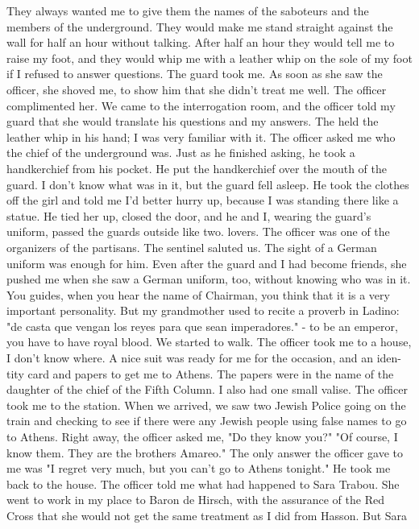 They always wanted me to give them the names of the saboteurs and the 
members of the underground. They would make me stand straight against 
the wall for half an hour without talking. After half an hour they 
would tell me to raise my foot, and they would whip me with a leather 
whip on the sole of my foot if I refused to answer questions. 
The guard took me. As soon as she saw the officer, she shoved me, 
to show him that she didn't treat me well. The officer complimented her. 
We came to the interrogation room, and the officer told my guard that 
she would translate his questions and my answers. The held the 
leather whip in his hand; I was very familiar with it. The officer asked 
me who the chief of the underground was. Just as he finished asking, 
he took a handkerchief from his pocket. He put the handkerchief 
over the mouth of the guard. I don't know what was in it, but the 
guard fell asleep. He took the clothes off the girl and told me I'd 
better hurry up, because I was standing there like a statue. He tied
her up, closed the door, and he and I, wearing the guard's uniform, 
passed the guards outside like two. lovers. The officer was one of the 
organizers of the partisans. The sentinel saluted us. The sight of a 
German uniform was enough for him. Even after the guard and I had 
become friends, she pushed me when she saw a German uniform, too, 
without knowing who was in it. 
You guides, when you hear the name of Chairman, you think that it 
is a very important personality. But my grandmother used to recite a 
proverb in Ladino: "de casta que vengan los reyes para que sean imperadores." 
- to be an emperor, you have to have royal blood. 
We started to walk. The officer took me to a house, I don't know 
where. A nice suit was ready for me for the occasion, and an iden-
tity card and papers to get me to Athens. The papers were in the name 
of the daughter of the chief of the Fifth Column. I also had one small 
valise. The officer took me to the station. When we arrived, we saw 
two Jewish Police going on the train and checking to see if there were 
any Jewish people using false names to go to Athens. Right away, the 
officer asked me, "Do they know you?" "Of course, I know them. They 
are the brothers Amareo." The only answer the officer gave to me was 
"I regret very much, but you can't go to Athens tonight." He took me 
back to the house. 
The officer told me what had happened to Sara Trabou. She went to 
work in my place to Baron de Hirsch, with the assurance of the Red Cross 
that she would not get the same treatment as I did from Hasson. But Sara 
